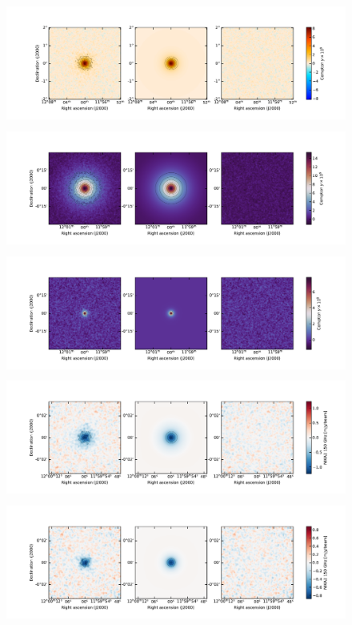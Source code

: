 \begin{figure}[t]
    \centering
    \includegraphics[height=4cm, trim={2cm 0.7cm 1.5cm 1.5cm}, clip]{../validation/results/C1/Planck/data_model_residuals_maps.pdf}
    \includegraphics[height=4cm, trim={2cm 0.7cm 1.5cm 1.5cm}, clip]{../validation/results/C1/SPT/data_model_residuals_maps.pdf}
    \includegraphics[height=4cm, trim={2cm 0.7cm 1.5cm 1.5cm}, clip]{../validation/results/C2/SPT/data_model_residuals_maps.pdf}
    \includegraphics[height=4cm, trim={2cm 0.7cm 1.5cm 1.5cm}, clip]{../validation/results/C2/NIKA2/data_model_residuals_maps.pdf}
    \includegraphics[height=4cm, trim={2cm 0.7cm 1.5cm 1.5cm}, clip]{../validation/results/C3/NIKA2/data_model_residuals_maps.pdf}

\end{figure}
